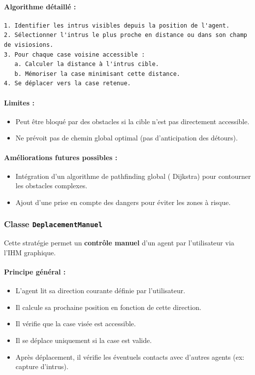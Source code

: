 \paragraph{Algorithme détaillé :}
\begin{verbatim}
1. Identifier les intrus visibles depuis la position de l'agent.
2. Sélectionner l'intrus le plus proche en distance ou dans son champ de visiosions.
3. Pour chaque case voisine accessible :
   a. Calculer la distance à l'intrus cible.
   b. Mémoriser la case minimisant cette distance.
4. Se déplacer vers la case retenue.
\end{verbatim}

\paragraph{Limites :}
\begin{itemize}
    \item Peut être bloqué par des obstacles si la cible n'est pas directement accessible.
    \item Ne prévoit pas de chemin global optimal (pas d'anticipation des détours).
\end{itemize}

\paragraph{Améliorations futures possibles :}
\begin{itemize}
    \item Intégration d’un algorithme de pathfinding global ( Dijkstra) pour contourner les obstacles complexes.
    \item Ajout d’une prise en compte des dangers pour éviter les zones à risque.
\end{itemize}
\subsubsection{ Classe \texttt{DeplacementManuel}}

Cette stratégie permet un \textbf{contrôle manuel} d'un agent par l'utilisateur via l'IHM graphique.

\paragraph{Principe général :}
\begin{itemize}
    \item L'agent lit sa direction courante définie par l'utilisateur.
    \item Il calcule sa prochaine position en fonction de cette direction.
    \item Il vérifie que la case visée est accessible.
    \item Il se déplace uniquement si la case est valide.
    \item Après déplacement, il vérifie les éventuels contacts avec d'autres agents (ex: capture d'intrus).
\end{itemize}

